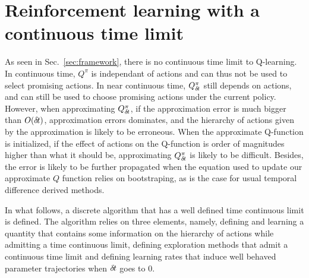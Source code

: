 \section{Reinforcement learning with a continuous time limit}
As seen in Sec.~\ref{sec:framework}, there is no continuous time limit to
Q-learning. In continuous time, $Q^\pi$ is independant of actions and can thus
not be used to select promising actions.  In near continuous time, $Q^\pi_{\delta\hspace{-.1em}t}$
still depends on actions, and can still be used to choose promising actions
under the current policy. However, when approximating $Q^\pi_{\delta\hspace{-.1em}t}$, if the
approximation error is much bigger than $O({\delta\hspace{-.1em}t})$, approximation errors
dominates, and the hierarchy of actions given by the approximation is likely to
be erroneous.  When the approximate Q-function is initialized, if the effect of
actions on the Q-function is order of magnitudes higher than what it should be,
approximating $Q^\pi_{\delta\hspace{-.1em}t}$ is likely to be difficult. Besides, the error is likely
to be further propagated when the equation used to update our approximate $Q$
function relies on bootstraping, as is the case for usual temporal difference
derived methods.

In what follows, a discrete algorithm that has a well defined time continuous
limit is defined. The algorithm relies on three elements, namely, defining and
learning a quantity that contains some information on the hierarchy of actions
while admitting a time continuous limit, defining exploration methods that
admit a continuous time limit and defining learning rates that induce well
behaved parameter trajectories when ${\delta\hspace{-.1em}t}$ goes to $0$.


